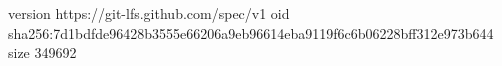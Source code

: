 version https://git-lfs.github.com/spec/v1
oid sha256:7d1bdfde96428b3555e66206a9eb96614eba9119f6c6b06228bff312e973b644
size 349692
